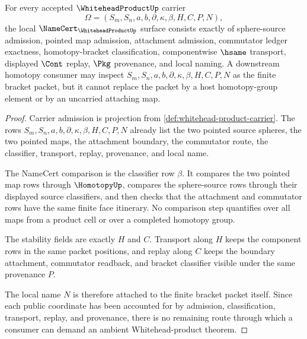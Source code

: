 \begin{theorem}
\label{thm:whitehead-product-namecert-obligations}
For every accepted $\WhiteheadProductUp$ carrier
$$
\Omega=(S_m,S_n,a,b,\partial,\kappa,\beta,H,C,P,N),
$$
the local $\NameCert_{\WhiteheadProductUp}$ surface consists exactly of sphere-source admission, pointed map admission, attachment admission, commutator ledger exactness, homotopy-bracket classification, componentwise $\hsame$ transport, displayed $\Cont$ replay, $\Pkg$ provenance, and local naming. A downstream homotopy consumer may inspect $S_m,S_n,a,b,\partial,\kappa,\beta,H,C,P,N$ as the finite bracket packet, but it cannot replace the packet by a host homotopy-group element or by an uncarried attaching map.
\end{theorem}
\begin{proof}
Carrier admission is projection from \autoref{def:whitehead-product-carrier}. The rows $S_m,S_n,a,b,\partial,\kappa,\beta,H,C,P,N$ already list the two pointed source spheres, the two pointed maps, the attachment boundary, the commutator route, the classifier, transport, replay, provenance, and local name.

The NameCert comparison is the classifier row $\beta$. It compares the two pointed map rows through $\HomotopyUp$, compares the sphere-source rows through their displayed source classifiers, and then checks that the attachment and commutator rows have the same finite face itinerary. No comparison step quantifies over all maps from a product cell or over a completed homotopy group.

The stability fields are exactly $H$ and $C$. Transport along $H$ keeps the component rows in the same packet positions, and replay along $C$ keeps the boundary attachment, commutator readback, and bracket classifier visible under the same provenance $P$.

The local name $N$ is therefore attached to the finite bracket packet itself. Since each public coordinate has been accounted for by admission, classification, transport, replay, and provenance, there is no remaining route through which a consumer can demand an ambient Whitehead-product theorem.
\end{proof}

